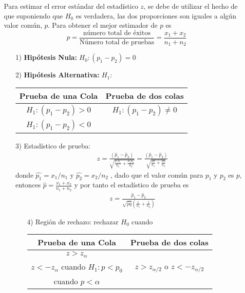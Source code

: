 Para estimar el error est\'andar del estad\'istico $z$, se debe de utilizar el hecho de que suponiendo que $H_{0}$ es verdadera, las dos proporciones son iguales a alg\'un valor com\'un, $p$. Para obtener el mejor estimador de $p$ es
$$p=\frac{\textrm{n\'umero total de \'exitos}}{\textrm{N\'umero total de pruebas}}=\frac{x_{1}+x_{2}}{n_{1}+n_{2}}$$

\begin{itemize}
\item[1) ] \textbf{Hip\'otesis Nula:} $H_{0}:\left(p_{1}-p_{2}\right)=0$
\item[2) ] \textbf{Hip\'otesis Alternativa: } $H_{1}:$
\begin{tabular}{cc}\hline
\textbf{Prueba de una Cola} & \textbf{Prueba de dos colas}\\\hline
$H_{1}:\left(p_{1}-p_{2}\right)>0$ & $H_{1}:\left(p_{1}-p_{2}\right)\neq 0$\\ 
$H_{1}:\left(p_{1}-p_{2}\right)<0$&\\
\end{tabular}
\item[3) ] Estad\'istico de prueba:
\begin{eqnarray*}
z=\frac{\left(\hat{p}_{1}-\hat{p}_{2}\right)}{\sqrt{\frac{p_{1}q_{1}}{n_{1}}+\frac{p_{2}q_{2}}{n_{2}}}}=\frac{\left(\hat{p}_{1}-\hat{p}_{2}\right)}{\sqrt{\frac{pq}{n_{1}}+\frac{pq}{n_{2}}}}
\end{eqnarray*}
donde $\hat{p_{1}}=x_{1}/n_{1}$ y $\hat{p_{2}}=x_{2}/n_{2}$ , dado que el valor com\'un para $p_{1}$ y $p_{2}$ es $p$, entonces $\hat{p}=\frac{x_{1}+x_{2}}{n_{1}+n_{2}}$ y por tanto el estad\'istico de prueba es
\begin{eqnarray*}
z=\frac{\hat{p}_{1}-\hat{p}_{2}}{\sqrt{\hat{p}\hat{q}}\left(\frac{1}{n_{1}}+\frac{1}{n_{2}}\right)}
\end{eqnarray*}
\begin{itemize}
\item[4) ] Regi\'on de rechazo: rechazar $H_{0}$ cuando
\begin{tabular}{cc}\hline
\textbf{Prueba de una Cola} & \textbf{Prueba de dos colas}\\\hline
$z>z_{\alpha}$ & \\
$z<-z_{\alpha}$ cuando $H_{1}:p<p_{0}$&$z>z_{\alpha/2}$ o $z<-z_{\alpha/2}$\\
 cuando $p<\alpha$&\\
\end{tabular}
\end{itemize}




\end{itemize}
